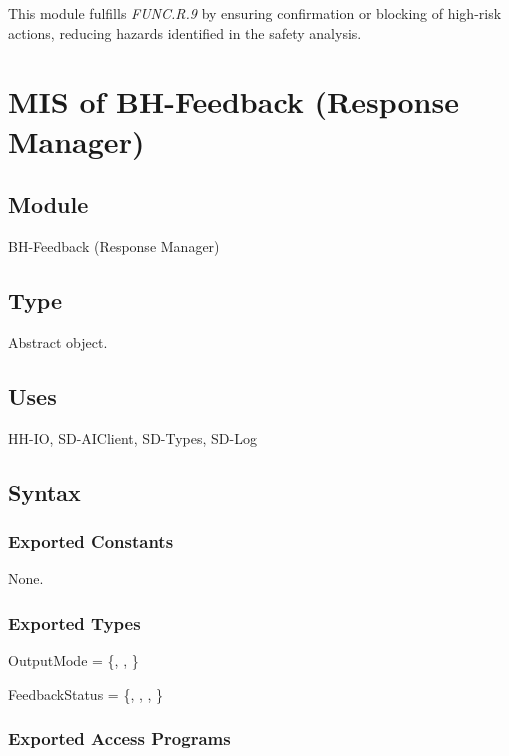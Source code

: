 \documentclass[12pt, titlepage]{article}
\begin{document}
\noindent
This module fulfills \textit{FUNC.R.9} by ensuring confirmation or blocking of
high-risk actions, reducing hazards identified in the safety analysis.

\section{MIS of BH-Feedback (Response Manager)} \label{mod:BHFeedback}

\subsection{Module}

BH-Feedback (Response Manager)

\subsection{Type}

Abstract object.

\subsection{Uses}

HH-IO, SD-AIClient, SD-Types, SD-Log

\subsection{Syntax}

\subsubsection{Exported Constants}

None.

\subsubsection{Exported Types}

\noindent OutputMode = \{, , \}

\noindent FeedbackStatus = \{, , ,
\}

\subsubsection{Exported Access Programs}
\end{document}
